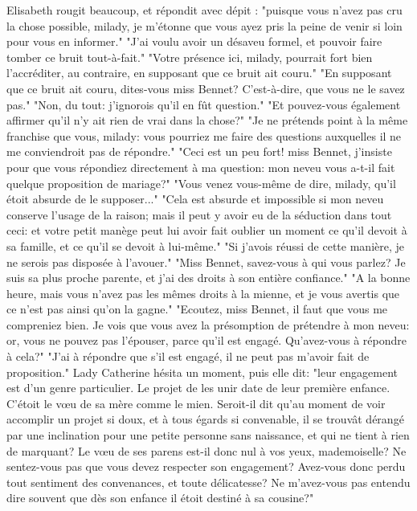 Elisabeth rougit beaucoup, et répondit avec dépit : "puisque vous n'avez pas cru la chose possible, milady, je m'étonne que vous ayez pris la peine de venir si loin pour vous en informer."
"J'ai voulu avoir un désaveu formel, et pouvoir faire tomber ce bruit tout-à-fait."
\setcounter{page}{254}
"Votre présence ici, milady, pourrait fort bien l'accréditer, au contraire, en supposant que ce bruit ait couru."
"En supposant que ce bruit ait couru, dites-vous miss Bennet? C'est-à-dire, que vous ne le savez pas."
"Non, du tout: j'ignorois qu'il en fût question."
"Et pouvez-vous également affirmer qu'il n'y ait rien de vrai dans la chose?"
"Je ne prétends point à la même franchise que vous, milady: vous pourriez me faire des questions auxquelles il ne me conviendroit pas de répondre."
"Ceci est un peu fort! miss Bennet, j'insiste pour que vous répondiez directement à ma question: mon neveu vous a-t-il fait quelque proposition de mariage?"
"Vous venez vous-même de dire, milady, qu'il étoit absurde de le supposer..."
"Cela est absurde et impossible si mon neveu conserve l'usage de la raison; mais il peut y avoir eu de la séduction dans tout ceci: et votre petit manège peut lui avoir fait oublier un moment ce qu'il devoit à sa famille, et ce qu'il se devoit à lui-même."
"Si j'avois réussi de cette manière, je ne serois pas disposée à l'avouer."
"Miss Bennet, savez-vous à qui vous parlez?\setcounter{page}{255} Je suis sa plus proche parente, et j'ai des droits à son entière confiance."
"A la bonne heure, mais vous n'avez pas les mêmes droits à la mienne, et je vous avertis que ce n'est pas ainsi qu'on la gagne."
"Ecoutez, miss Bennet, il faut que vous me compreniez bien. Je vois que vous avez la présomption de prétendre à mon neveu: or, vous ne pouvez pas l'épouser, parce qu'il est engagé. Qu'avez-vous à répondre à cela?"
"J'ai à répondre que s'il est engagé, il ne peut pas m'avoir fait de proposition."
Lady Catherine hésita un moment, puis elle dit: "leur engagement est d'un genre particulier. Le projet de les unir date de leur première enfance. C'étoit le vœu de sa mère comme le mien. Seroit-il dit qu'au moment de voir accomplir un projet si doux, et à tous égards si convenable, il se trouvât dérangé par une inclination pour une petite personne sans naissance, et qui ne tient à rien de marquant? Le vœu de ses parens est-il donc nul à vos yeux, mademoiselle? Ne sentez-vous pas que vous devez respecter son engagement? Avez-vous donc perdu tout sentiment des convenances, et toute délicatesse? Ne m'avez-vous pas entendu dire souvent que dès son enfance il étoit destiné à sa cousine?"
